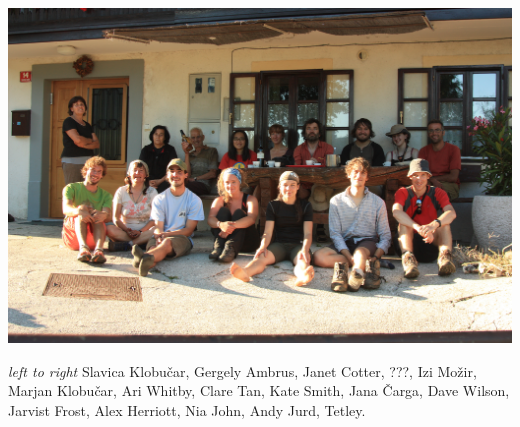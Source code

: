 \begin{pagefigure}
\checkoddpage \ifoddpage \forcerectofloat \else \forceversofloat \fi
   \centering
\includegraphics[width = \textwidth]{2011/alex_pitcher_award/2011-08-11-17.46.07-Gergely Ambrus-Canon450D-IMG_1396-Mountain Derig--orig.jpg}
\caption{\textit{left to right} Slavica Klobučar, Gergely Ambrus, Janet Cotter, ???, Izi Možir, Marjan Klobučar, Ari Whitby, Clare Tan, Kate Smith, Jana Čarga, Dave Wilson, Jarvist Frost, Alex Herriott, Nia John, Andy Jurd, Tetley. } \label{Klobučar 2011}
\end{pagefigure}
